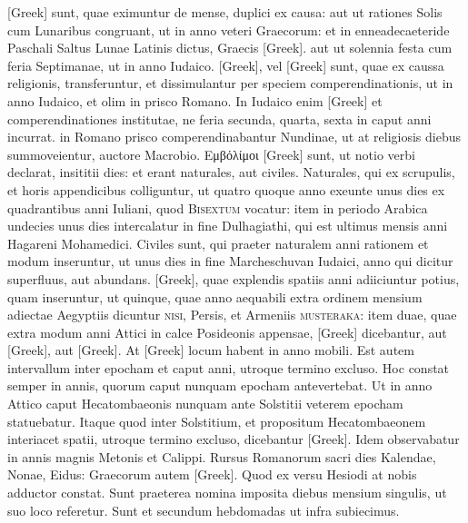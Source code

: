 \textgreek{[Greek]} sunt, quae eximuntur de
mense, duplici ex causa: aut ut rationes Solis cum Lunaribus congruant,
ut in anno veteri Graecorum: et in enneadecaeteride Paschali
Saltus Lunae Latinis dictus, Graecis \textgreek{[Greek]}.
aut ut solennia
festa cum feria Septimanae, ut in anno Iudaico.
\textgreek{[Greek]}, vel \textgreek{[Greek]}
sunt, quae ex caussa religionis, transferuntur, et dissimulantur per speciem
comperendinationis, ut in anno Iudaico, et olim in prisco Romano.
In Iudaico enim \textgreek{[Greek]} et comperendinationes
 institutae, ne
feria secunda, quarta, sexta in caput anni incurrat. in Romano prisco
comperendinabantur Nundinae, ut at religiosis diebus summoveientur,
auctore Macrobio.
\textgreek{Εμβόλίμοι [Greek]} sunt, ut notio verbi declarat, insititii
dies: et erant naturales, aut civiles.
Naturales, qui ex scrupulis, et
horis appendicibus colliguntur, ut quatro quoque anno exeunte unus
dies ex quadrantibus anni Iuliani, quod \textsc{Bisextum} vocatur: item
in periodo Arabica undecies unus dies intercalatur in fine Dulhagiathi,
qui est ultimus mensis anni Hagareni Mohamedici.
Civiles sunt,
qui praeter naturalem anni rationem et modum inseruntur, ut unus
dies in fine Marcheschuvan Iudaici, anno qui dicitur superfluus, aut
abundans.
\textgreek{[Greek]}, quae explendis spatiis anni adiiciuntur potius,
quam inseruntur, ut quinque, quae anno aequabili extra ordinem mensium
adiectae Aegyptiis dicuntur \textsc{nisi}, Persis, et Armeniis
 \textsc{musteraka}: 
item duae, quae extra modum anni Attici in calce Posideonis
appensae, \textgreek{[Greek]} dicebantur,
 aut \textgreek{[Greek]}, aut \textgreek{[Greek]}.
At \textgreek{[Greek]} locum habent in anno mobili.
Est autem intervallum
inter epocham et caput anni, utroque termino excluso.
Hoc
constat semper in annis, quorum caput nunquam epocham antevertebat.
Ut in anno Attico caput Hecatombaeonis nunquam ante Solstitii
veterem epocham statuebatur.
Itaque quod inter Solstitium, et
propositum Hecatombaeonem interiacet spatii, utroque termino excluso,
dicebantur \textgreek{[Greek]}.
Idem observabatur in annis magnis
Metonis et Calippi.
Rursus Romanorum sacri dies Kalendae, Nonae,
Eidus: Graecorum autem \textgreek{[Greek]}.
Quod ex versu Hesiodi at
nobis adductor constat.
Sunt praeterea nomina imposita diebus mensium
singulis, ut suo loco referetur.
Sunt et secundum hebdomadas
ut infra subiecimus.

